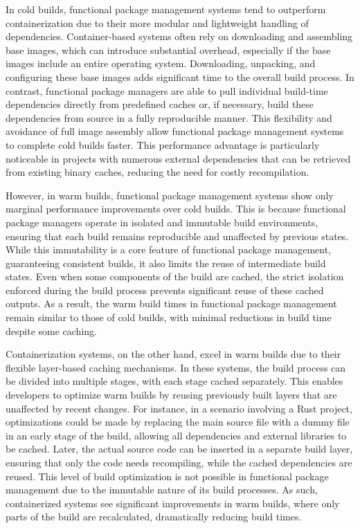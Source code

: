In cold builds, functional package management systems tend to outperform containerization
due to their more modular and lightweight handling of dependencies. Container-based systems
often rely on downloading and assembling base images, which can introduce substantial
overhead, especially if the base images include an entire operating system. Downloading,
unpacking, and configuring these base images adds significant time to the overall build
process. In contrast, functional package managers are able to pull individual build-time
dependencies directly from predefined caches or, if necessary, build these dependencies
from source in a fully reproducible manner. This flexibility and avoidance of full image
assembly allow functional package management systems to complete cold builds faster. This
performance advantage is particularly noticeable in projects with numerous external
dependencies that can be retrieved from existing binary caches, reducing the need for
costly recompilation.

However, in warm builds, functional package management systems show only marginal
performance improvements over cold builds. This is because functional package managers
operate in isolated and immutable build environments, ensuring that each build remains
reproducible and unaffected by previous states. While this immutability is a core feature
of functional package management, guaranteeing consistent builds, it also limits the reuse
of intermediate build states. Even when some components of the build are cached, the strict
isolation enforced during the build process prevents significant reuse of these cached
outputs. As a result, the warm build times in functional package management remain similar
to those of cold builds, with minimal reductions in build time despite some caching.

Containerization systems, on the other hand, excel in warm builds due to their flexible
layer-based caching mechanisms. In these systems, the build process can be divided into
multiple stages, with each stage cached separately. This enables developers to optimize
warm builds by reusing previously built layers that are unaffected by recent changes. For
instance, in a scenario involving a Rust project, optimizations could be made by replacing
the main source file with a dummy file in an early stage of the build, allowing all
dependencies and external libraries to be cached. Later, the actual source code can be
inserted in a separate build layer, ensuring that only the code needs recompiling, while
the cached dependencies are reused. This level of build optimization is not possible in
functional package management due to the immutable nature of its build processes. As such,
containerized systems see significant improvements in warm builds, where only parts of the
build are recalculated, dramatically reducing build times.

